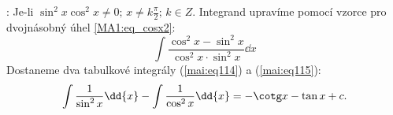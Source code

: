 \begin{mdframed}[style=mdmathsolution]
  [\ref{mai:eq150}]: Je-li \(\sin^2x\cos^2x\neq0;\, x\neq k\frac{\pi}{2};\, k\in Z\). Integrand
  upravíme pomocí vzorce pro dvojnásobný úhel \ref{MA1:eq_cosx2}:
  \begin{equation*}
    \int\frac{\cos^2x-\sin^2x}{\cos^2x\cdot\sin^2x}\dd{x} 
  \end{equation*}
  Dostaneme dva tabulkové integrály (\ref{mai:eq114}) a (\ref{mai:eq115}):
  \begin{gather*}
    \int\frac{1}{\sin^2x}\dd{x} -\int\frac{1}{\cos^2x}\dd{x} = -\cotg x - \tan x + c. 
  \end{gather*}
\end{mdframed}